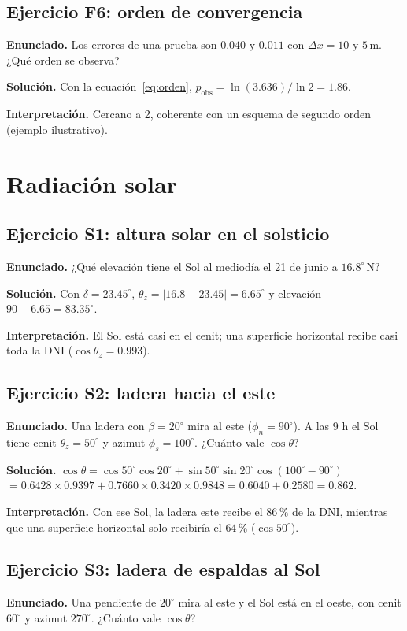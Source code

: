 \documentclass[11pt,a4paper]{article}
\begin{document}
\subsection*{Ejercicio F6: orden de convergencia}
\textbf{Enunciado.} Los errores de una prueba son $0.040$ y $0.011$ con $\Delta x=10$ y $5$\,m. ¿Qué orden se
observa?

\textbf{Solución.} Con la ecuación~\eqref{eq:orden}, $p_{\text{obs}}=\ln(3.636)/\ln2=1.86$.

\textbf{Interpretación.} Cercano a 2, coherente con un esquema de segundo orden (ejemplo ilustrativo).

\section{Radiación solar}
\label{sec:ej-solar}

\subsection*{Ejercicio S1: altura solar en el solsticio}
\textbf{Enunciado.} ¿Qué elevación tiene el Sol al mediodía el 21 de junio a $16.8^\circ$\,N?

\textbf{Solución.} Con $\delta=23.45^\circ$, $\theta_z=|16.8-23.45|=6.65^\circ$ y elevación $90-6.65=83.35^\circ$.

\textbf{Interpretación.} El Sol está casi en el cenit; una superficie horizontal recibe casi toda la DNI
($\cos\theta_z=0.993$).

\subsection*{Ejercicio S2: ladera hacia el este}
\textbf{Enunciado.} Una ladera con $\beta=20^\circ$ mira al este ($\phi_n=90^\circ$). A las 9 h el Sol tiene cenit
$\theta_z=50^\circ$ y azimut $\phi_s=100^\circ$. ¿Cuánto vale $\cos\theta$?

\textbf{Solución.} $\cos\theta=\cos50^\circ\cos20^\circ+\sin50^\circ\sin20^\circ\cos(100^\circ-90^\circ)$
$=0.6428\times0.9397+0.7660\times0.3420\times0.9848=0.6040+0.2580=0.862$.

\textbf{Interpretación.} Con ese Sol, la ladera este recibe el $86\,\mathrm{\%}$ de la DNI, mientras que una superficie
horizontal solo recibiría el $64\,\mathrm{\%}$ ($\cos50^\circ$).

\subsection*{Ejercicio S3: ladera de espaldas al Sol}
\textbf{Enunciado.} Una pendiente de $20^\circ$ mira al este y el Sol está en el oeste, con cenit $60^\circ$ y
azimut $270^\circ$. ¿Cuánto vale $\cos\theta$?
\end{document}

